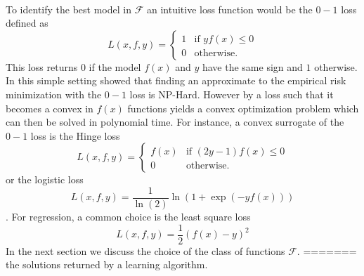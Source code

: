 \paragraph{}
To identify the best model in $\mathcal{F}$ an intuitive loss function would be
the $0-1$ loss defined as
\begin{dmath*}
    L(x, f, y) =
    \begin{cases}
        1 & \text{if } yf(x) \le 0 \\
        0 & \text{otherwise}.
    \end{cases}
\end{dmath*}
This loss returns $0$ if the model $f(x)$ and $y$ have the same sign and $1$
otherwise. In this simple setting \citet{hoffgen1995robust} showed that finding
an approximate to the empirical risk minimization with the $0-1$ loss is
NP-Hard. However by  a loss such that it becomes a convex in
$f(x)$ functions yields a convex optimization problem which can then be solved
in polynomial time. For instance, a convex surrogate of the $0-1$ loss is the
Hinge loss
\begin{dmath*}
    L(x, f, y) =
    \begin{cases}
        f(x) & \text{if } (2y-1)f(x) \le 0 \\
        0 & \text{otherwise}.
    \end{cases}
\end{dmath*}
or the logistic loss
\begin{dmath*}
    L(x, f, y) = \frac{1}{\ln(2)} \ln(1 + \exp(-yf(x)))
\end{dmath*}.
For regression, a common choice is the least square loss
\begin{dmath*}
    L(x, f, y) = \frac{1}{2}(f(x) - y)^2
\end{dmath*}
In the next section we discuss the choice of the class of functions
$\mathcal{F}$.
=======
the solutions returned by a learning algorithm. 

